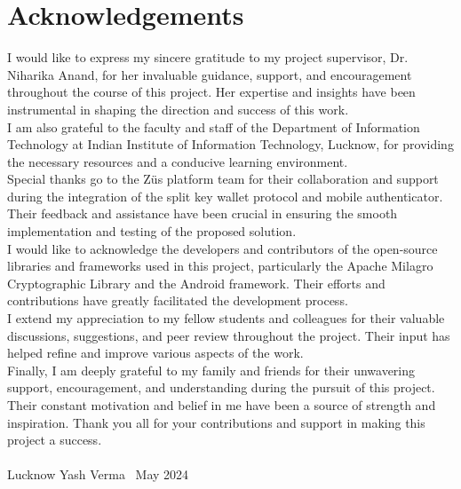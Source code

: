 \chapter*{Acknowledgements}
I would like to express my sincere gratitude to my project supervisor, Dr. Niharika Anand, for her invaluable guidance, support, and encouragement throughout the course of this project. Her expertise and insights have been instrumental in shaping the direction and success of this work.\\
I am also grateful to the faculty and staff of the Department of Information Technology at Indian Institute of Information Technology, Lucknow, for providing the necessary resources and a conducive learning environment.\\
Special thanks go to the Züs platform team for their collaboration and support during the integration of the split key wallet protocol and mobile authenticator. Their feedback and assistance have been crucial in ensuring the smooth implementation and testing of the proposed solution. \\
I would like to acknowledge the developers and contributors of the open-source libraries and frameworks used in this project, particularly the Apache Milagro Cryptographic Library and the Android framework. Their efforts and contributions have greatly facilitated the development process.\\
I extend my appreciation to my fellow students and colleagues for their valuable discussions, suggestions, and peer review throughout the project. Their input has helped refine and improve various aspects of the work.\\
Finally, I am deeply grateful to my family and friends for their unwavering support, encouragement, and understanding during the pursuit of this project. Their constant motivation and belief in me have been a source of strength and inspiration.
Thank you all for your contributions and support in making this project a success. \\ \\
\noindent Lucknow \hfill Yash Verma \
\noindent May 2024
\thispagestyle{empty}
\setcounter{page}{3}
